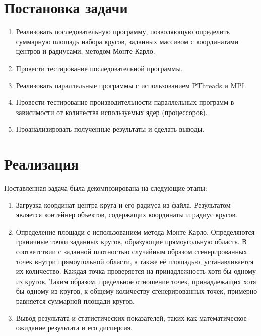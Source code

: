 





\tableofcontents
\newpage


\section{Постановка задачи}

\begin{enumerate}
\item Реализовать последовательную программу, позволяющую определить суммарную площадь набора кругов, заданных массивом с координатами центров и радиусами, методом Монте-Карло. 

\item Провести тестирование последовательной программы.

\item Реализовать параллельные программы с использованием PThreads и MPI.

\item Провести тестирование производительности параллельных программ в зависимости от количества используемых ядер (процессоров).

\item Проанализировать полученные результаты и сделать выводы.
\end{enumerate}

\section{Реализация}

Поставленная задача была декомпозирована на следующие этапы:

\begin{enumerate}

\item Загрузка координат центра круга и его радиуса из файла. Результатом является контейнер объектов, содержащих координаты и радиус кругов.

\item Определение площади с использованием метода Монте-Карло. Определяются граничные точки заданных кругов, образующие прямоугольную область. В соответствии с заданной плотностью случайным образом сгенерированных точек внутри прямоугольной области, а также её площадью, устанавливается их количество. Каждая точка проверяется на принадлежность хотя бы одному из кругов. Таким образом, предельное отношение точек, принадлежащих хотя бы одному из кругов, к общему количеству сгенерированных точек, примерно равняется суммарной площади кругов.

\item Вывод результата и статистических показателей, таких как математическое ожидание результата и его дисперсия.

\end{enumerate}

